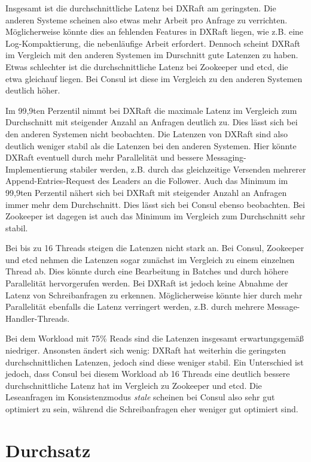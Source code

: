 Insgesamt ist die durchschnittliche Latenz bei DXRaft am geringsten. Die anderen Systeme scheinen also etwas mehr Arbeit pro Anfrage zu verrichten. Möglicherweise könnte dies an fehlenden Features in DXRaft liegen, wie z.B. eine Log-Kompaktierung, die nebenläufige Arbeit erfordert. Dennoch scheint DXRaft im Vergleich mit den anderen Systemen im Durschnitt gute Latenzen zu haben. Etwas schlechter ist die durchschnittliche Latenz bei Zookeeper und etcd, die etwa gleichauf liegen. Bei Consul ist diese im Vergleich zu den anderen Systemen deutlich höher.

Im 99,9ten Perzentil nimmt bei DXRaft die maximale Latenz im Vergleich zum Durchschnitt mit steigender Anzahl an Anfragen deutlich zu. Dies lässt sich bei den anderen Systemen nicht beobachten. Die Latenzen von DXRaft sind also deutlich weniger stabil als die Latenzen bei den anderen Systemen. Hier könnte DXRaft eventuell durch mehr Parallelität und bessere Messaging-Implementierung stabiler werden, z.B. durch das gleichzeitige Versenden mehrerer Append-Entries-Request des Leaders an die Follower. Auch das Minimum im 99,9ten Perzentil nähert sich bei DXRaft mit steigender Anzahl an Anfragen immer mehr dem Durchschnitt. Dies lässt sich bei Consul ebenso beobachten. Bei Zookeeper ist dagegen ist auch das Minimum im Vergleich zum Durchschnitt sehr stabil.

Bei bis zu 16 Threads steigen die Latenzen nicht stark an. Bei Consul, Zookeeper und etcd nehmen die Latenzen sogar zunächst im Vergleich zu einem einzelnen Thread ab. Dies könnte durch eine Bearbeitung in Batches und durch höhere Parallelität hervorgerufen werden. Bei DXRaft ist jedoch keine Abnahme der Latenz von Schreibanfragen zu erkennen. Möglicherweise könnte hier durch mehr Parallelität ebenfalls die Latenz verringert werden, z.B. durch mehrere Message-Handler-Threads.

Bei dem Workload mit 75\% Reads sind die Latenzen insgesamt erwartungsgemäß niedriger. Ansonsten ändert sich wenig: DXRaft hat weiterhin die geringsten durchschnittlichen Latenzen, jedoch sind diese weniger stabil. Ein Unterschied ist jedoch, dass Consul bei diesem Workload ab 16 Threads eine deutlich bessere durchschnittliche Latenz hat im Vergleich zu Zookeeper und etcd. Die Leseanfragen im Konsistenzmodus \textit{stale} scheinen bei Consul also sehr gut optimiert zu sein, während die Schreibanfragen eher weniger gut optimiert sind.

\section{Durchsatz}
\label{throughput}

